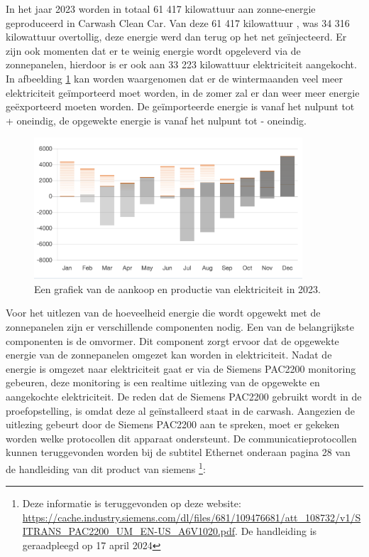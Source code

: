 In het jaar 2023 worden in totaal 61 417 kilowattuur aan zonne-energie geproduceerd in Carwash Clean Car. Van deze 61 417 kilowattuur , was 34 316 kilowattuur overtollig, deze energie werd dan terug op het net geïnjecteerd. Er zijn ook momenten dat er te weinig energie wordt opgeleverd via de zonnepanelen, hierdoor is er ook aan 33 223 kilowattuur elektriciteit aangekocht. In afbeelding \ref{fig:energie-productie-2023} kan worden waargenomen dat er de wintermaanden veel meer elektriciteit geïmporteerd moet worden, in de zomer zal er dan weer meer energie geëxporteerd moeten worden. De geïmporteerde energie is vanaf het nulpunt tot + oneindig, de opgewekte energie is vanaf het nulpunt tot - oneindig.

\begin{figure}[h]
    \includegraphics[width=10cm]{./graphics/Energie-opbrengsten-2023}
    \caption{Een grafiek van de aankoop en productie van elektriciteit in 2023.}
    \label{fig:energie-productie-2023}
\end{figure}

Voor het uitlezen van de hoeveelheid energie die wordt opgewekt met de zonnepanelen zijn er verschillende componenten nodig. Een van de belangrijkste componenten is de omvormer. Dit component zorgt ervoor dat de opgewekte energie van de zonnepanelen omgezet kan worden in elektriciteit. Nadat de energie is omgezet naar elektriciteit gaat er via de Siemens PAC2200 monitoring gebeuren, deze monitoring is een realtime uitlezing van de opgewekte en aangekochte elektriciteit. De reden dat de Siemens PAC2200 gebruikt wordt in de proefopstelling, is omdat deze al geïnstalleerd staat in de carwash. Aangezien de uitlezing gebeurt door de Siemens PAC2200 aan te spreken, moet er gekeken worden welke protocollen dit apparaat ondersteunt. De communicatieprotocollen  kunnen teruggevonden worden bij de subtitel Ethernet onderaan pagina 28 van de handleiding van dit product van siemens \footnote{Deze informatie is teruggevonden op deze website: \url{https://cache.industry.siemens.com/dl/files/681/109476681/att_108732/v1/SITRANS_PAC2200_UM_EN-US_A6V1020.pdf}. De handleiding is geraadpleegd op 17 april 2024}:

